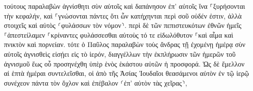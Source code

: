 \documentclass{openreader}
\begin{document}
τούτους παραλαβὼν ἁγνίσθητι σὺν αὐτοῖς καὶ δαπάνησον ἐπ’ αὐτοῖς ἵνα ⸀ξυρήσονται τὴν κεφαλήν, καὶ ⸀γνώσονται πάντες ὅτι ὧν κατήχηνται περὶ σοῦ οὐδέν ἐστιν, ἀλλὰ στοιχεῖς καὶ αὐτὸς ⸂φυλάσσων τὸν νόμον⸃. 
περὶ δὲ τῶν πεπιστευκότων ἐθνῶν ἡμεῖς ⸀ἀπεστείλαμεν ⸀κρίναντες φυλάσσεσθαι αὐτοὺς τό τε εἰδωλόθυτον ⸀καὶ αἷμα καὶ πνικτὸν καὶ πορνείαν. 
τότε ὁ Παῦλος παραλαβὼν τοὺς ἄνδρας τῇ ἐχομένῃ ἡμέρᾳ σὺν αὐτοῖς ἁγνισθεὶς εἰσῄει εἰς τὸ ἱερόν, διαγγέλλων τὴν ἐκπλήρωσιν τῶν ἡμερῶν τοῦ ἁγνισμοῦ ἕως οὗ προσηνέχθη ὑπὲρ ἑνὸς ἑκάστου αὐτῶν ἡ προσφορά. 
Ὡς δὲ ἔμελλον αἱ ἑπτὰ ἡμέραι συντελεῖσθαι, οἱ ἀπὸ τῆς Ἀσίας Ἰουδαῖοι θεασάμενοι αὐτὸν ἐν τῷ ἱερῷ συνέχεον πάντα τὸν ὄχλον καὶ ἐπέβαλον ⸂ἐπ’ αὐτὸν τὰς χεῖρας⸃, 
\end{document}

